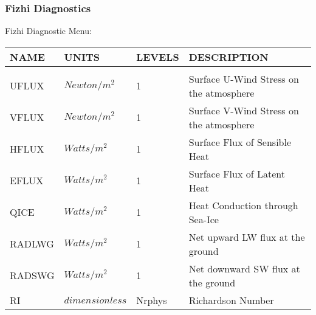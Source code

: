 \subsubsection{Fizhi Diagnostics}

Fizhi Diagnostic Menu:
\label{sec:pkg:fizhi:diagnostics}

\begin{tabular}{llll}
\hline\hline
 NAME & UNITS & LEVELS & DESCRIPTION \\
\hline

&\\
 UFLUX    &   $Newton/m^2$  &    1  
         &\begin{minipage}[t]{3in}
          {Surface U-Wind Stress on the atmosphere}
         \end{minipage}\\
 VFLUX    &   $Newton/m^2$  &    1  
         &\begin{minipage}[t]{3in}
          {Surface V-Wind Stress on the atmosphere}
         \end{minipage}\\
 HFLUX    &   $Watts/m^2$  &    1  
         &\begin{minipage}[t]{3in}
          {Surface Flux of Sensible Heat}
         \end{minipage}\\
 EFLUX    &   $Watts/m^2$  &    1  
         &\begin{minipage}[t]{3in}
          {Surface Flux of Latent Heat}
         \end{minipage}\\
 QICE     &   $Watts/m^2$  &    1  
         &\begin{minipage}[t]{3in}
          {Heat Conduction through Sea-Ice}
         \end{minipage}\\
 RADLWG   &   $Watts/m^2$ &    1  
         &\begin{minipage}[t]{3in}
          {Net upward LW flux at the ground}
         \end{minipage}\\
 RADSWG   &   $Watts/m^2$  &    1 
         &\begin{minipage}[t]{3in}
          {Net downward SW flux at the ground} 
         \end{minipage}\\
 RI       &  $dimensionless$ &  Nrphys 
         &\begin{minipage}[t]{3in}
          {Richardson Number}
         \end{minipage}\\

\end{tabular}
